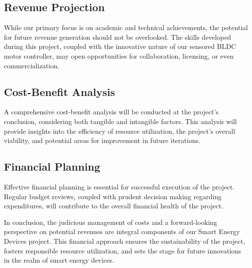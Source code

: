 \subsection{Revenue Projection}
While our primary focus is on academic and technical achievements, the potential for future revenue generation should not be overlooked. The skills developed during this project, coupled with the innovative nature of our sensored BLDC motor controller, may open opportunities for collaboration, licensing, or even commercialization.

\subsection{Cost-Benefit Analysis}
A comprehensive cost-benefit analysis will be conducted at the project's conclusion, considering both tangible and intangible factors. This analysis will provide insights into the efficiency of resource utilization, the project's overall viability, and potential areas for improvement in future iterations.

\subsection{Financial Planning}
Effective financial planning is essential for successful execution of the project. Regular budget reviews, coupled with prudent decision making regarding expenditures, will contribute to the overall financial health of the project.

In conclusion, the judicious management of costs and a forward-looking perspective on potential revenues are integral components of our Smart Energy Devices project. This financial approach ensures the sustainability of the project, fosters responsible resource utilization, and sets the stage for future innovations in the realm of smart energy devices.
